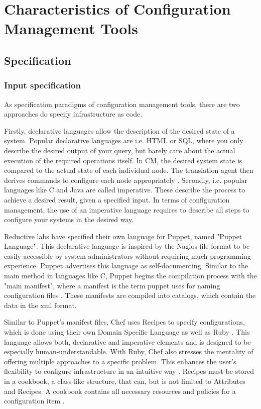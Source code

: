 \section{Characteristics of Configuration Management Tools}

\subsection{Specification}

\subsubsection{Input specification}

As specification paradigms of configuration management tools, there are two approaches do specify infrastructure as code. 

Firstly, declarative languages allow the description of the desired state of a system. Popular declarative languages are i.e. HTML or SQL, where you only describe the desired output of your query, but barely care about the actual execution of the required operations itself. In CM, the desired system state is compared to the actual state of each individual node. The translation agent then derives commands to configure each node appropriately \cite{delaet2010survey}. Secondly, i.e. popular languages like C and Java are called imperative. These describe the process to achieve a desired result, given a specified input. In terms of configuration management, the use of an imperative language requires to describe all steps to configure your systems in the desired way.

Reductive labs have specified their own language for Puppet, named "Puppet Language". This declarative language is inspired by the Nagios file format to be easily accessible by system administrators without requiring much programming experience. Puppet advertises this language  as self-documenting.
Similar to the main method in languages like C, Puppet begins the compilation process with the "main manifest", where a manifest is the term puppet uses for naming configuration files \cite{puppetcomlangsum}. These manifests are compiled into catalogs, which contain the data in the xml format.

Similar to Puppet's manifest files, Chef uses Recipes to specify configurations, which is done using their own Domain Specific Language as well as Ruby \cite{pandey2012investigating}. This language allows both, declarative and imperative elements and is designed to be especially human-understandable. With Ruby, Chef also stresses the mentality of offering multiple approaches to a specific problem. This enhances the user's flexibility to configure infrastructure in an intuitive way \cite{https://docs.chef.io/recipes.html}. Recipes must be stored in a cookbook, a class-like structure, that can, but is not limited to Attributes and Recipes. A cookbook contains all necessary resources and policies for a configuration item \cite{chefiocookbooks}. 

